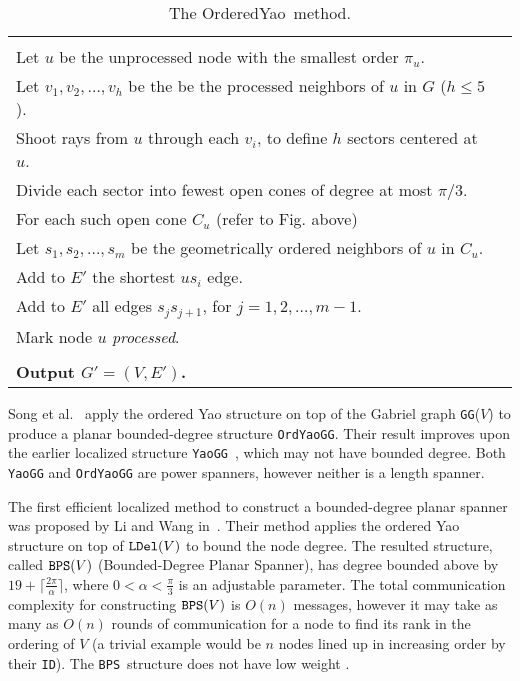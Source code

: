 \documentclass{llncs}
\newcommand{\id}{{\tt ID}}
\newcommand{\ldel}{{\tt LDel}}
\newcommand{\bps}{{\tt BPS}}
\newcommand{\oyao}{{\sc OrderedYao}}
\begin{document}
\begin{table}[htpb]
\begin{center}
{\begin{tabular}{lc}
{\begin{minipage}[ht]{0.8\linewidth}
{\begin{tabbing}
\> Repeat $|V|$ times \\
\> \> Let $u$ be the unprocessed node with the smallest order $\pi_u$. \\
\> \> Let $v_1, v_2, \ldots, v_h$ be the be the processed neighbors of $u$ in $G$ ($h \le 5$). \\
\> \> Shoot rays from $u$ through each $v_i$, to define $h$ sectors centered at $u$. \\
\> \> Divide each sector into fewest open cones of degree at most $\pi/3$. \\
\> \> For each such open cone $C_u$ (refer to Fig. above) \\
\> \> \> Let $s_1, s_2, \ldots, s_m$ be the geometrically ordered neighbors of $u$ in $C_u$. \\
\> \> \> Add to $E'$ the shortest $us_i$ edge. \\
\> \> \> Add to $E'$ all edges $s_js_{j+1}$, for $j = 1, 2, \ldots, m-1$. \\
\> \> Mark node $u$ \emph{processed}. \\
\\
{\bf Output $G' = (V, E')$.}
\end{tabbing}}
\end{minipage}}
\end{tabular}
}\end{center}
\caption{The \oyao\ method.}
\label{tab:orderedyao}
\end{table}


Song et al.~\cite{SWLF04} apply the ordered Yao structure
on top of the Gabriel graph {\tt GG}($V$) to produce
a planar bounded-degree structure {\tt OrdYaoGG}. Their result improves
upon the earlier localized structure
{\tt YaoGG}~\cite{li02sparse}, which may not have bounded degree. Both
{\tt YaoGG} and {\tt OrdYaoGG} are power spanners, however neither is a length spanner. 

The first efficient localized method to construct a bounded-degree
planar spanner was proposed by Li and Wang in~\cite{WangLi03,LiWang04}.
Their method applies the ordered Yao structure on top of $\ldel(V)$ to
bound the node degree. The resulted structure, called $\bps(V)$
(Bounded-Degree Planar Spanner), has degree bounded above by
$19 + \lceil \frac{2\pi}{\alpha} \rceil$,
where $0 < \alpha < \frac{\pi}{3}$ is an adjustable parameter.
The total communication complexity for constructing $\bps(V)$ is
$O(n)$ messages, however it may take as many as $O(n)$ rounds of
communication for a node to find its rank in the ordering of $V$
(a trivial example would be $n$ nodes
lined up in increasing order by their \id).
The \bps\ structure does not have low weight \cite{li-localmst-03}.
\end{document}
